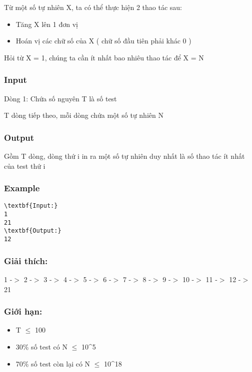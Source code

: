 

Từ một số tự nhiên X, ta có thể thực hiện 2 thao tác sau:
\begin{itemize}
	\item Tăng X lên 1 đơn vị
	\item Hoán vị các chữ số của X ( chữ số đầu tiên phải khác 0 )
\end{itemize}

Hỏi từ X = 1, chúng ta cần ít nhất bao nhiêu thao tác để X = N

\subsubsection{Input}

Dòng 1: Chứa số nguyên T là số test

T dòng tiếp theo, mỗi dòng chứa một số tự nhiên N

\subsubsection{Output}

Gồm T dòng, dòng thứ i in ra một số tự nhiên duy nhất là số thao tác ít nhất của test thứ i

\subsubsection{Example}
\begin{verbatim}
\textbf{Input:}
1
21
\textbf{Output:}
12\end{verbatim}

\subsubsection{Giải thích:}

1 -$>$ 2 -$>$ 3 -$>$ 4 -$>$ 5 -$>$ 6 -$>$ 7 -$>$ 8 -$>$ 9 -$>$ 10 -$>$ 11 -$>$ 12 -$>$ 21

\subsubsection{Giới hạn:}
\begin{itemize}
	\item T  $\le$  100
	\item 30\% số test có N  $\le$  10^5
	\item 70\% số test còn lại có N  $\le$  10^18
\end{itemize}
